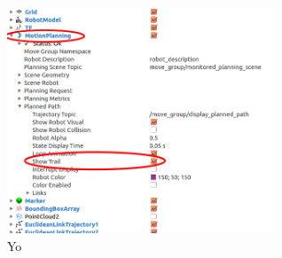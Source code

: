 \begin{figure}
\includegraphics[width=8cm]{images/installation_first/show_trail.png}
\centering
\caption{Yo}
\label{fig:show_trail}
\end{figure}